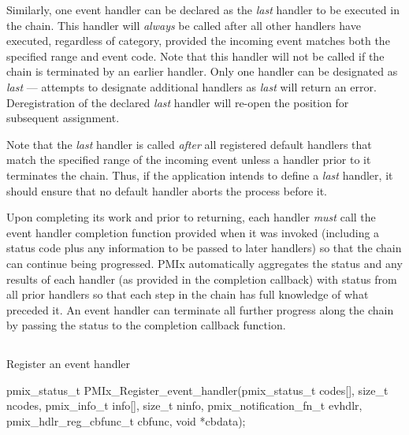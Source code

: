 Similarly, one event handler can be declared as the \textit{last} handler to be executed in the chain. This handler will \textit{always} be called after all other handlers have executed, regardless of category, provided the incoming event matches both the specified range and event code. Note that this handler will not be called if the chain is terminated by an earlier handler. Only one handler can be designated as \textit{last} --- attempts to designate additional handlers as \textit{last} will return an error. Deregistration of the declared \textit{last} handler will re-open the position for subsequent assignment.

\adviceuserstart
Note that the \textit{last} handler is called \textit{after} all registered default handlers that match the specified range of the incoming event unless a handler prior to it terminates the chain. Thus, if the application intends to define a \textit{last} handler, it should ensure that no default handler aborts the process before it.
\adviceuserend

Upon completing its work and prior to returning, each handler \textit{must} call the event handler completion function provided when it was invoked (including a status code plus any information to be passed to later handlers) so that the chain can continue being progressed. \ac{PMIx} automatically aggregates the status and any results of each handler (as provided in the completion callback) with status from all prior handlers so that each step in the chain has full knowledge of what preceded it. An event handler can terminate all further progress along the chain by passing the  status to the completion callback function.


\subsection{}

\summary

Register an event handler

\format

\cspecificstart
\begin{codepar}
pmix_status_t
PMIx_Register_event_handler(pmix_status_t codes[], size_t ncodes,
                            pmix_info_t info[], size_t ninfo,
                            pmix_notification_fn_t evhdlr,
                            pmix_hdlr_reg_cbfunc_t cbfunc,
                            void *cbdata);
\end{codepar}
\cspecificend

